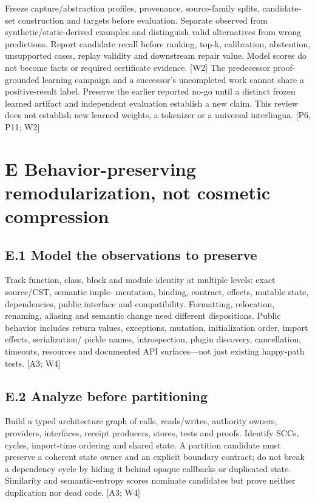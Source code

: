 \documentclass{article}
\begin{document}
Freeze capture/abstraction profiles, provenance, source-family splits, candidate-set construction and
targets before evaluation. Separate observed from synthetic/static-derived examples and distinguish
valid alternatives from wrong predictions. Report candidate recall before ranking, top-k, calibration,
abstention, unsupported cases, replay validity and downstream repair value. Model scores do not
become facts or required certificate evidence. [W2]
The predecessor proof-grounded learning campaign and a successor’s uncompleted work cannot share
a positive-result label. Preserve the earlier reported no-go until a distinct frozen learned artifact and
independent evaluation establish a new claim. This review does not establish new learned weights, a
tokenizer or a universal interlingua. [P6, P11; W2]


\section*{E Behavior-preserving remodularization, not cosmetic compression}
\subsection*{E.1 Model the observations to preserve}

Track function, class, block and module identity at multiple levels: exact source/CST, semantic imple-
mentation, binding, contract, effects, mutable state, dependencies, public interface and compatibility.
Formatting, relocation, renaming, aliasing and semantic change need different dispositions. Public
behavior includes return values, exceptions, mutation, initialization order, import effects, serialization/
pickle names, introspection, plugin discovery, cancellation, timeouts, resources and documented API
surfaces—not just existing happy-path tests. [A3; W4]

\subsection*{E.2 Analyze before partitioning}

Build a typed architecture graph of calls, reads/writes, authority owners, providers, interfaces, receipt
producers, stores, tests and proofs. Identify SCCs, cycles, import-time ordering and shared state. A
partition candidate must preserve a coherent state owner and an explicit boundary contract; do not
break a dependency cycle by hiding it behind opaque callbacks or duplicated state. Similarity and
semantic-entropy scores nominate candidates but prove neither duplication nor dead code. [A3; W4]
\end{document}
